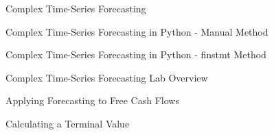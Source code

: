 \documentclass[]{article}
\begin{document}
\begin{section}{Complex Time-Series Forecasting}

\end{section}
\begin{section}{Complex Time-Series Forecasting in Python - Manual Method}

\end{section}
\begin{section}{Complex Time-Series Forecasting in Python - finstmt Method}

\end{section}
\begin{section}{Complex Time-Series Forecasting Lab Overview}

\end{section}
\begin{section}{Applying Forecasting to Free Cash Flows}

\end{section}
\begin{section}{Calculating a Terminal Value}

\end{section}
\end{document}
